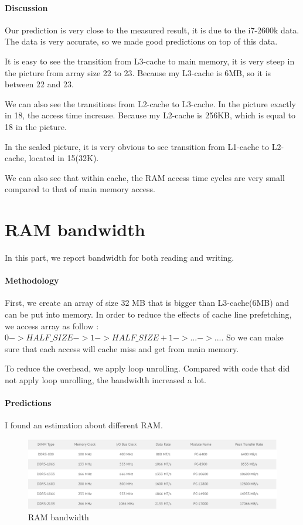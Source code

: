 \paragraph{Discussion}
Our prediction is very close to the measured result, it is due to the i7-2600k data. The data is very accurate, so we made good predictions on top of this data.

It is easy to see the transition from L3-cache to main memory, it is very steep in the picture from array size 22 to 23. Because my L3-cache is 6MB, so it is between 22 and 23.

We can also see the transitions from L2-cache to L3-cache. In the picture exactly in 18, the access time increase. Because my L2-cache is 256KB, which is equal to 18 in the picture.

In the scaled picture, it is very obvious to see transition from L1-cache to L2-cache, located in 15(32K).

We can also see that within cache, the RAM access time cycles are very small compared to that of main memory access.



\section{RAM bandwidth}
In this part, we report bandwidth for both reading and writing.

\paragraph{Methodology}
First, we create an array of size 32 MB that is bigger than L3-cache(6MB) and can be put into memory. In order to reduce the effects of cache line prefetching, we access array as follow : $0 -> HALF\_SIZE -> 1 -> HALF\_SIZE+1 -> ... -> ...$. So we can make sure that each access will cache miss and get from main memory.

To reduce the overhead, we apply loop unrolling. Compared with code that did not apply loop unrolling, the bandwidth increased  a lot.

\paragraph{Predictions}

I found an estimation about different RAM\cite{ramref}.

\begin{figure}[!htb]
\centering
\includegraphics[width=6in]{./pics/ram_ref.png}
\caption{RAM bandwidth}\label{RAM bandwidth}
\end{figure}

